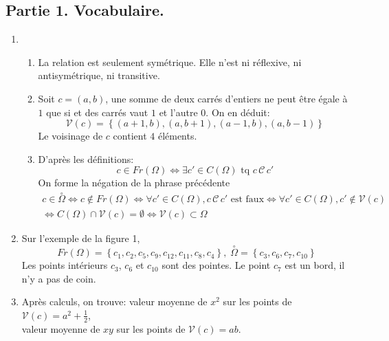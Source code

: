 \subsection*{Partie 1. Vocabulaire.}
\begin{enumerate}
  \item
\begin{enumerate}
  \item La relation est seulement symétrique. Elle n'est ni réflexive, ni antisymétrique, ni transitive.  
  \item Soit $c=(a,b)$, une somme de deux carrés d'entiers ne peut être égale à $1$ que si et des carrés vaut $1$ et l'autre $0$. On en déduit:
\begin{displaymath}
  \mathcal{V}(c) = \left\lbrace (a+1,b), (a,b+1), (a-1,b), (a,b-1)\right\rbrace 
\end{displaymath}
Le voisinage de $c$ contient $4$ éléments.
  \item D'après les définitions:
\begin{displaymath}
  c\in Fr(\Omega) \Leftrightarrow \exists c'\in C(\Omega) \text{ tq } c\, \mathcal{C}\, c'
  \end{displaymath}
On forme la négation de la phrase précédente
\begin{multline*}
c\in \overset{\circ}{\Omega} \Leftrightarrow c\notin Fr(\Omega) 
\Leftrightarrow \forall c'\in C(\Omega), c\, \mathcal{C}\, c' \text{ est faux}
\Leftrightarrow \forall c'\in C(\Omega), c'\notin \mathcal{V}(c) \\
\Leftrightarrow C(\Omega)\cap \mathcal{V}(c) = \emptyset
\Leftrightarrow \mathcal{V}(c) \subset \Omega
\end{multline*}
\end{enumerate}

  \item Sur l'exemple de la figure 1, 
\begin{displaymath}
  Fr(\Omega) = \left\lbrace c_1, c_2, c_5, c_9, c_{12}, c_{11}, c_8, c_4\right\rbrace,\;
  \overset{\circ}{\Omega}=\left\lbrace c_3, c_6, c_7, c_10 \right\rbrace 
\end{displaymath}
Les points intérieurs $c_3$, $c_6$ et $c_{10}$ sont des pointes. Le point $c_7$ est un bord, il n'y a pas de coin.

  \item Après calculs, on trouve:
valeur moyenne de $x^2$ sur les points de $\mathcal{V}(c)= a^2 + \frac{1}{2}$,\\
valeur moyenne de $xy$ sur les points de $\mathcal{V}(c)= ab$.
\end{enumerate}


